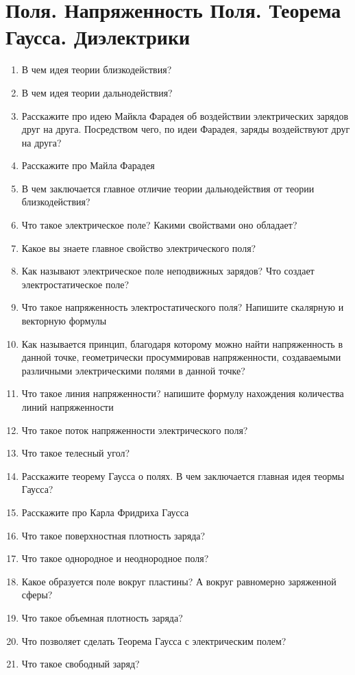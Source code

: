 \documentclass[12pt,a4paper]{report}
\begin{document}
\section{Поля. Напряженность Поля. Теорема Гаусса. Диэлектрики}
\begin{enumerate}
\item В чем идея теории близкодействия?
\item В чем идея теории дальнодействия?
\item Расскажите про идею Майкла Фарадея об воздействии электрических зарядов друг на друга. Посредством чего, по идеи Фарадея, заряды воздействуют друг на друга?
\item Расскажите про Майла Фарадея
\item В чем заключается главное отличие теории дальнодействия от теории близкодействия?
\item Что такое электрическое поле? Какими свойствами оно обладает?
\item Какое вы знаете главное свойство электрического поля?
\item Как называют электрическое поле неподвижных зарядов? Что создает электростатическое поле?
\item Что такое напряженность электростатического поля? Напишите скалярную и векторную формулы
\item Как называется принцип, благодаря которому можно найти напряженность в данной точке, геометрически просуммировав напряженности, создаваемыми различными электрическими полями в данной точке?
\item Что такое линия напряженности?  напишите формулу нахождения количества линий напряженности
\item Что такое поток напряженности электрического поля?
\item Что такое телесный угол?
\item Расскажите теорему Гаусса о полях. В чем заключается главная идея теормы Гаусса?
\item Расскажите про Карла Фридриха Гаусса
\item Что такое поверхностная плотность заряда?
\item Что такое однородное и неоднородное поля?
\item Какое образуется поле вокруг пластины? А вокруг равномерно заряженной сферы?
\item Что такое объемная плотность заряда?
\item Что позволяет сделать Теорема Гаусса с электрическим полем?
\item Что такое свободный заряд?

\end{enumerate}
\end{document}
